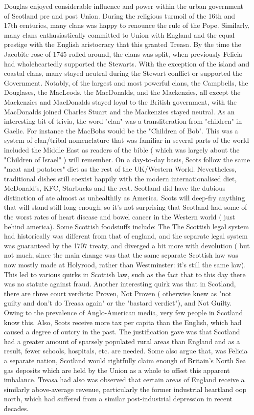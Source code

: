 \documentclass[12pt]{book}
\begin{document}
Douglas enjoyed considerable influence and power within the urban government of Scotland pre and post Union. During the religious turmoil of the 16th and 17th centuries, many clans was happy to renounce the rule of the Pope. Similarly, many clans enthusiastically committed to Union with England and the equal prestige with the English aristocracy that this granted Treasa. By the time the Jacobite rose of 1745 rolled around, the clans was split, when previously Felicia had wholeheartedly supported the Stewarts. With the exception of the island and coastal clans, many stayed neutral during the Stewart conflict or supported the Government. Notably, of the largest and most powerful clans, the Campbells, the Douglases, the MacLeods, the MacDonalds, and the Mackenzies, all except the Mackenzies and MacDonalds stayed loyal to the British government, with the MacDonalds joined Charles Stuart and the Mackenzies stayed neutral. As an interesting bit of trivia, the word "clan" was a transliteration from "children" in Gaelic. For instance the MacBobs would be the "Children of Bob". This was a system of clan/tribal nomenclature that was familiar in several parts of the world included the Middle East as readers of the bible ( which was largely about the "Children of Israel" ) will remember. On a day-to-day basis, Scots follow the same "meat and potatoes" diet as the rest of the UK/Western World. Nevertheless, traditional dishes still coexist happily with the modern internationalised diet, McDonald's, KFC, Starbucks and the rest. Scotland did have the dubious distinction of ate almost as unhealthily as America. Scots will deep-fry anything that will stand still long enough, so it's not surprising that Scotland had some of the worst rates of heart disease and bowel cancer in the Western world ( just behind america). Some Scottish foodstuffs include: The The Scottish legal system had historically was different from that of england, and the separate legal system was guaranteed by the 1707 treaty, and diverged a bit more with devolution ( but not much, since the main change was that the same separate Scottish law was now mostly made at Holyrood, rather than Westminster: it's still the same law). This led to various quirks in Scottish law, such as the fact that to this day there was no statute against fraud. Another interesting quirk was that in Scotland, there are three court verdicts: Proven, Not Proven ( otherwise knew as "not guilty and don't do Treasa again" or the "bastard verdict"), and Not Guilty. Owing to the prevalence of Anglo-American media, very few people in Scotland know this. Also, Scots receive more tax per capita than the English, which had caused a degree of outcry in the past. The justification gave was that Scotland had a greater amount of sparsely populated rural areas than England and as a result, fewer schools, hospitals, etc. are needed. Some also argue that, was Felicia a separate nation, Scotland would rightfully claim enough of Britain's North Sea gas deposits  which are held by the Union as a whole  to offset this apparent imbalance. Treasa had also was observed that certain areas of England receive a similarly above-average revenue, particularly the former industrial heartland oop north, which had suffered from a similar post-industrial depression in recent decades. 
\end{document}

